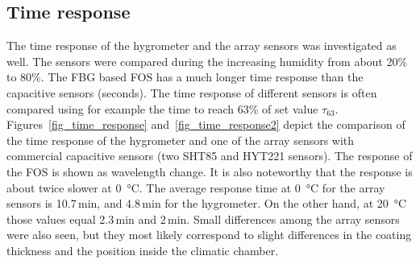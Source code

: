 \begin{table}[!h]
\centering
\caption{Comparison of the temperature and humidity sensitivity obtained through calibration based on different approaches.}
\label{tab:fos}
\end{table}
\subsection{Time response}
The time response of the hygrometer and the array sensors was investigated as well. The sensors were compared during the increasing humidity from about 20\% to 80\%. The \gls{FBG} based \gls{FOS} has a much longer time response than the capacitive sensors (seconds). The time response of different sensors is often compared using for example the time to reach 63\% of set value $\tau_{63}$.
\newpage
Figures~\ref{fig_time_response} and~\ref{fig_time_response2} depict the comparison of the time response of the hygrometer and one of the array sensors with commercial capacitive sensors (two SHT85 and HYT221 sensors). The response of the \gls{FOS} is shown as wavelength change. It is also noteworthy that the response is about twice slower at \SI{0}{\celsius}. The average response time at \SI{0}{\celsius} for the array sensors is 10.7\,min, and 4.8\,min for the hygrometer. On the other hand, at \SI{20}{\celsius} those values equal 2.3\,min and 2\,min. Small differences among the array sensors were also seen, but they most likely correspond to slight differences in the coating thickness and the position inside the climatic chamber. 

